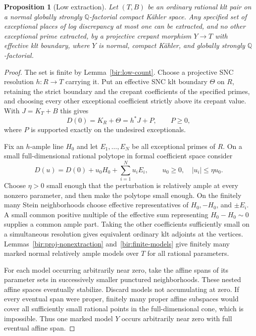 \documentclass[11pt,letterpaper]{article}
\newcommand{\Q}{\mathbb{Q}}
\newtheorem{proposition}[theorem]{Proposition}
\theoremstyle{definition}
\theoremstyle{remark}
\begin{document}
\begin{proposition}[Low extraction]
\label{bir:low-extraction}
Let $(T,B)$ be an ordinary rational klt pair on a normal globally
strongly $\Q$-factorial compact K\"ahler space.  Any specified set of
exceptional places of log discrepancy at most one can be extracted,
and no other exceptional prime extracted, by a projective crepant
morphism $Y\to T$ with effective klt boundary, where $Y$ is normal,
compact K\"ahler, and globally strongly $\Q$-factorial.
\end{proposition}

\begin{proof}
The set is finite by Lemma~\ref{bir:low-count}.  Choose a projective
SNC resolution $h:R\to T$ carrying it.  Put an effective SNC klt
boundary $\Theta$ on $R$, retaining the strict boundary and the
crepant coefficients of the specified primes, and choosing every
other exceptional coefficient strictly above its crepant value.
With $J=K_T+B$ this gives
\begin{equation}
 D(0)=K_R+\Theta=h^*J+P,\qquad P\geq0,
 \label{bir:extraction-origin}
\end{equation}
where $P$ is supported exactly on the undesired exceptionals.

Fix an $h$-ample line $H_0$ and let $E_1,\ldots,E_N$ be all
exceptional primes of $R$.  On a small full-dimensional rational
polytope in formal coefficient space consider
\begin{equation}
 D(u)=D(0)+u_0H_0+\sum_{i=1}^{N}u_iE_i,
 \qquad u_0\geq0,\quad |u_i|\leq\eta u_0.
 \label{bir:extraction-polytope}
\end{equation}
Choose $\eta>0$ small enough that the perturbation is relatively ample
at every nonzero parameter, and then make the polytope small enough.
On the finitely many Stein neighborhoods choose effective
representatives of $H_0,-H_0$, and $\pm E_i$.  A small common positive
multiple of the effective sum representing $H_0-H_0\sim0$ supplies a
common ample part.  Taking the other coefficients sufficiently small
on a simultaneous resolution gives equivalent ordinary klt adjoints
at the vertices.  Lemmas~\ref{bir:proj-nonextraction}
and~\ref{bir:finite-models} give finitely many marked normal relatively
ample models over $T$ for all rational parameters.

For each model occurring arbitrarily near zero, take the affine spans
of its parameter sets in successively smaller punctured
neighborhoods.  These nested affine spaces eventually stabilize.
Discard models not accumulating at zero.  If every eventual span
were proper, finitely many proper affine subspaces would cover all
sufficiently small rational points in the full-dimensional cone,
which is impossible.  Thus one marked model $Y$ occurs arbitrarily
near zero with full eventual affine span.


\end{proof}
\end{document}
